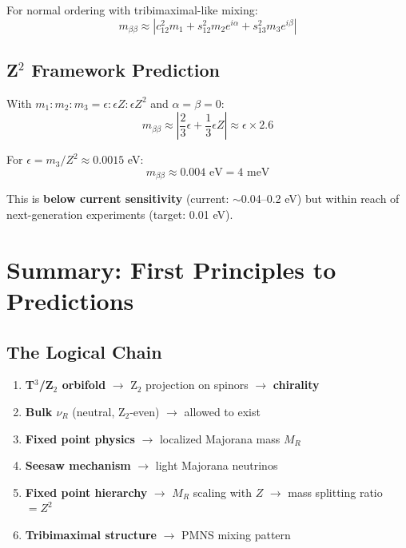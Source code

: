 \documentclass[12pt,a4paper]{article}
\begin{document}
For normal ordering with tribimaximal-like mixing:
\begin{equation}
m_{\beta\beta} \approx |c^2_{12} m_1 + s^2_{12} m_2 e^{i\alpha} + s^2_{13} m_3 e^{i\beta}|
\end{equation}

\subsection{Z$^2$ Framework Prediction}

With $m_1 : m_2 : m_3 = \epsilon : \epsilon Z : \epsilon Z^2$ and $\alpha = \beta = 0$:
\begin{equation}
m_{\beta\beta} \approx |\frac{2}{3} \epsilon + \frac{1}{3} \epsilon Z| \approx \epsilon \times 2.6
\end{equation}

For $\epsilon = m_3/Z^2 \approx 0.0015$ eV:
\begin{equation}
\boxed{m_{\beta\beta} \approx 0.004 \text{ eV} = 4 \text{ meV}}
\end{equation}

This is \textbf{below current sensitivity} (current: $\sim$0.04--0.2 eV) but within reach of next-generation experiments (target: 0.01 eV).

\section{Summary: First Principles to Predictions}

\subsection{The Logical Chain}

\begin{enumerate}
\item \textbf{T$^3$/Z$_2$ orbifold} $\rightarrow$ Z$_2$ projection on spinors $\rightarrow$ \textbf{chirality}
\item \textbf{Bulk $\nu_R$} (neutral, Z$_2$-even) $\rightarrow$ allowed to exist
\item \textbf{Fixed point physics} $\rightarrow$ localized Majorana mass $M_R$
\item \textbf{Seesaw mechanism} $\rightarrow$ light Majorana neutrinos
\item \textbf{Fixed point hierarchy} $\rightarrow$ $M_R$ scaling with $Z$ $\rightarrow$ mass splitting ratio $= Z^2$
\item \textbf{Tribimaximal structure} $\rightarrow$ PMNS mixing pattern
\end{enumerate}
\end{document}
